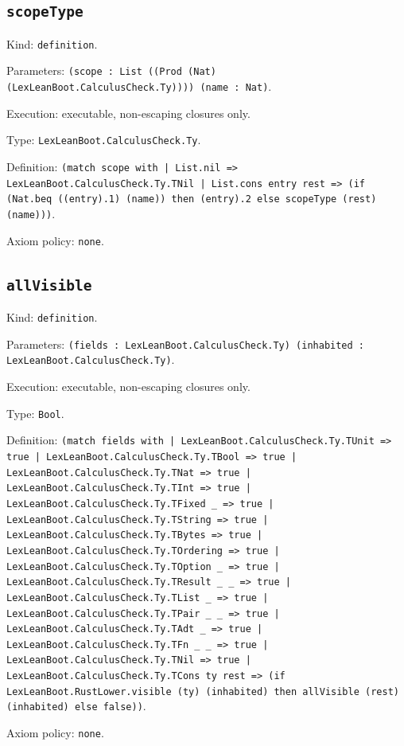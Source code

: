 \documentclass[11pt]{article}
\begin{document}
\subsection*{\texttt{scopeType}}
\noindent Kind: \texttt{definition}.\par
\noindent Parameters: \texttt{(scope : List ((Prod (Nat) (LexLeanBoot.CalculusCheck.Ty)))) (name : Nat)}.\par
\noindent Execution: executable, non-escaping closures only.\par
\noindent Type: \texttt{LexLeanBoot.CalculusCheck.Ty}.\par
\noindent Definition: \texttt{(match scope with | List.nil => LexLeanBoot.CalculusCheck.Ty.TNil | List.cons entry rest => (if (Nat.beq ((entry).1) (name)) then (entry).2 else scopeType (rest) (name)))}.\par
\noindent Axiom policy: \texttt{none}.\par
\subsection*{\texttt{allVisible}}
\noindent Kind: \texttt{definition}.\par
\noindent Parameters: \texttt{(fields : LexLeanBoot.CalculusCheck.Ty) (inhabited : LexLeanBoot.CalculusCheck.Ty)}.\par
\noindent Execution: executable, non-escaping closures only.\par
\noindent Type: \texttt{Bool}.\par
\noindent Definition: \texttt{(match fields with | LexLeanBoot.CalculusCheck.Ty.TUnit => true | LexLeanBoot.CalculusCheck.Ty.TBool => true | LexLeanBoot.CalculusCheck.Ty.TNat => true | LexLeanBoot.CalculusCheck.Ty.TInt => true | LexLeanBoot.CalculusCheck.Ty.TFixed \_ => true | LexLeanBoot.CalculusCheck.Ty.TString => true | LexLeanBoot.CalculusCheck.Ty.TBytes => true | LexLeanBoot.CalculusCheck.Ty.TOrdering => true | LexLeanBoot.CalculusCheck.Ty.TOption \_ => true | LexLeanBoot.CalculusCheck.Ty.TResult \_ \_ => true | LexLeanBoot.CalculusCheck.Ty.TList \_ => true | LexLeanBoot.CalculusCheck.Ty.TPair \_ \_ => true | LexLeanBoot.CalculusCheck.Ty.TAdt \_ => true | LexLeanBoot.CalculusCheck.Ty.TFn \_ \_ => true | LexLeanBoot.CalculusCheck.Ty.TNil => true | LexLeanBoot.CalculusCheck.Ty.TCons ty rest => (if LexLeanBoot.RustLower.visible (ty) (inhabited) then allVisible (rest) (inhabited) else false))}.\par
\noindent Axiom policy: \texttt{none}.\par
\end{document}
